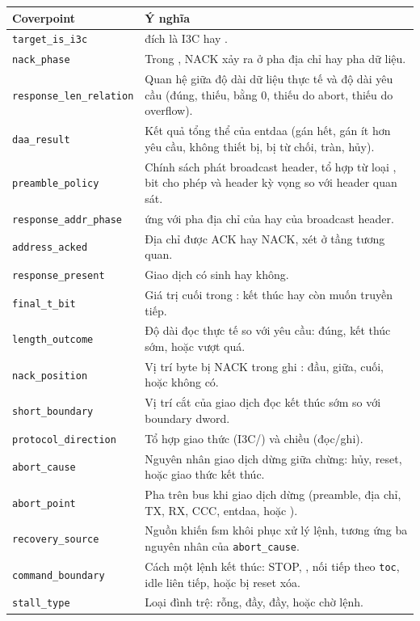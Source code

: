 \begin{longtable}{L{4.2cm} L{8.4cm}}
  \toprule
  \textbf{Coverpoint} & \textbf{Ý nghĩa} \\
  \midrule
  \endhead
  \texttt{target\_is\_i3c}       & \Target{} đích là I3C hay \iic{}. \\
  \texttt{nack\_phase}           & Trong \ImmediateDataTransfer{}, NACK xảy ra ở pha địa chỉ hay pha dữ liệu. \\
  \texttt{response\_len\_relation} & Quan hệ giữa độ dài dữ liệu thực tế và độ dài yêu cầu (đúng, thiếu, bằng 0, thiếu do abort, thiếu do overflow). \\
  \texttt{daa\_result}           & Kết quả tổng thể của \gls{entdaa} (gán hết, gán ít hơn yêu cầu, không thiết bị, bị từ chối, tràn, hủy). \\
  \texttt{preamble\_policy}      & Chính sách phát broadcast header, tổ hợp từ loại \Target{}, bit cho phép và header kỳ vọng so với header quan sát. \\
  \texttt{response\_addr\_phase} & \ResponseDescriptor{} ứng với pha địa chỉ của \Target{} hay của broadcast header. \\
  \texttt{address\_acked}        & Địa chỉ được ACK hay NACK, xét ở tầng tương quan. \\
  \texttt{response\_present}     & Giao dịch có sinh \ResponseDescriptor{} hay không. \\
  \texttt{final\_t\_bit}         & Giá trị \TBit{} cuối trong \PrivateRead{}: \Target{} kết thúc hay còn muốn truyền tiếp. \\
  \texttt{length\_outcome}       & Độ dài đọc thực tế so với yêu cầu: đúng, kết thúc sớm, hoặc vượt quá. \\
  \texttt{nack\_position}        & Vị trí byte bị NACK trong ghi \iic{}: đầu, giữa, cuối, hoặc không có. \\
  \texttt{short\_boundary}       & Vị trí cắt của giao dịch đọc kết thúc sớm so với boundary \gls{dword}. \\
  \texttt{protocol\_direction}   & Tổ hợp giao thức (I3C/\iic{}) và chiều (đọc/ghi). \\
  \texttt{abort\_cause}          & Nguyên nhân giao dịch dừng giữa chừng: \Host{} hủy, reset, hoặc giao thức kết thúc. \\
  \texttt{abort\_point}          & Pha trên bus khi giao dịch dừng (preamble, địa chỉ, TX, RX, CCC, \gls{entdaa}, hoặc \ResponseDescriptor{}). \\
  \texttt{recovery\_source}      & Nguồn khiến \gls{fsm} khôi phục xử lý lệnh, tương ứng ba nguyên nhân của \texttt{abort\_cause}. \\
  \texttt{command\_boundary}     & Cách một lệnh kết thúc: STOP, \RepeatedSTART{}, nối tiếp theo \texttt{toc}, idle liên tiếp, hoặc bị reset xóa. \\
  \texttt{stall\_type}           & Loại đình trệ: \TxFifo{} rỗng, \RxFifo{} đầy, \ResponseFifo{} đầy, hoặc chờ lệnh. \\
  \bottomrule
\end{longtable}
